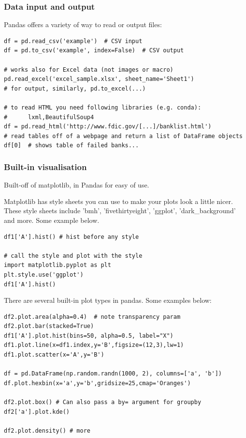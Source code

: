 \documentclass[11pt]{article}
\begin{document}
\subsubsection{Data input and output} 
Pandas offers a variety of way to read or output files:
\begin{lstlisting}
df = pd.read_csv('example')  # CSV input
df = pd.to_csv('example', index=False)  # CSV output

# works also for Excel data (not images or macro)            
pd.read_excel('excel_sample.xlsx', sheet_name='Sheet1') 
# for output, similarly, pd.to_excel(...)

# to read HTML you need following libraries (e.g. conda): 
#      lxml,BeautifulSoup4
df = pd.read_html('http://www.fdic.gov/[...]/banklist.html')  
# read tables off of a webpage and return a list of DataFrame objects
df[0]  # shows table of failed banks...
\end{lstlisting}

\subsubsection{Built-in visualisation}
Built-off of matplotlib, in Pandas for easy of use.

Matplotlib has style sheets you can use to make your plots look a little nicer. These style sheets include 'bmh', 'fivethirtyeight', 'ggplot', 'dark\_background' and more. Some example below.

\begin{lstlisting}
df1['A'].hist() # hist before any style

# call the style and plot with the style
import matplotlib.pyplot as plt
plt.style.use('ggplot')
df1['A'].hist()
\end{lstlisting}

There are several built-in plot types in pandas. Some examples below:
\begin{lstlisting}
df2.plot.area(alpha=0.4)  # note transparency param
df2.plot.bar(stacked=True)
df1['A'].plot.hist(bins=50, alpha=0.5, label="X")
df1.plot.line(x=df1.index,y='B',figsize=(12,3),lw=1)
df1.plot.scatter(x='A',y='B')

df = pd.DataFrame(np.random.randn(1000, 2), columns=['a', 'b'])
df.plot.hexbin(x='a',y='b',gridsize=25,cmap='Oranges')

df2.plot.box() # Can also pass a by= argument for groupby
df2['a'].plot.kde()

df2.plot.density() # more
\end{lstlisting}
\end{document}
